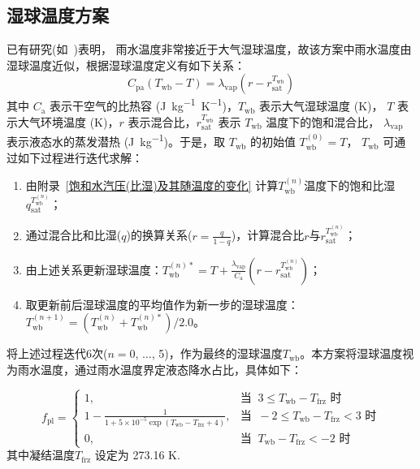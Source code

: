\subsection{湿球温度方案}\label{湿球温度方案}
已有研究(如~\citet{anderson1998moored})表明，
雨水温度非常接近于大气湿球温度，故该方案中雨水温度由湿球温度近似，根据湿球温度定义有如下关系：
\begin{equation}
  \label{eq:湿球温度定义}
  C_{\mathrm{p a}}\left(T_{\mathrm{w b}}-T\right)=\lambda_{\mathrm{vap}}\left(r-r_{\mathrm{s a t}}^{T_{\mathrm{w b}}}\right)
\end{equation}
其中 $C_{\mathrm{a}}$ 表示干空气的比热容 (\unit{J.kg^{-1}.K^{-1}})，$T_{\mathrm{wb}}$ 表示大气湿球温度 (K)，
$T$ 表示大气环境温度 (K)，$r$ 表示混合比，$r_{\mathrm{sat}}^{T_{\mathrm{wb}}}$ 表示 $T_{\mathrm{wb}}$ 温度下的饱和混合比，
$\lambda_{\mathrm {vap}}$ 表示液态水的蒸发潜热 (\unit{J.kg^{-1}})。于是，取 $T_{\mathrm{wb}}$ 的初始值 $T_{\mathrm{wb}}^{\left(0\right)}=T$，
$T_{\mathrm{wb}}$ 可通过如下过程进行迭代求解：
\begin{enumerate}
  \item 由附录~\ref{饱和水汽压(比湿)及其随温度的变化} 计算$T_{\mathrm{wb}}^{\left(n\right)}$温度下的饱和比湿$q_{\mathrm{sat}}^{T_{\mathrm{wb}}^{\left(n\right)}}$；
  \item 通过混合比和比湿($q$)的换算关系($r=\frac{q}{1-q}$)，计算混合比$r$与$r_{\mathrm{sat}}^{T_{\mathrm{wb}}^{\left(n\right)}}$；
  \item 由上述关系更新湿球温度：$T_{\mathrm{wb}}^{\left(n\right)\ast}=T+\frac{\lambda_{\mathrm {vap}}}{C_{\mathrm{a}}}\left(r-r_{\mathrm{sat}}^{T_{\mathrm{wb}}^{\left(n\right)}}\right)$；
  \item 取更新前后湿球温度的平均值作为新一步的湿球温度：$T_{\mathrm{wb}}^{\left(n+1\right)}=\left(T_{\mathrm{wb}}^{\left(n\right)}+T_{\mathrm{wb}}^{\left(n\right)\ast}\right)/2.0$。
\end{enumerate}
将上述过程迭代6次($n=0$, $\ldots$, 5)，作为最终的湿球温度$T_{\mathrm{wb}}$。本方案将湿球温度视为雨水温度，通过雨水温度界定液态降水占比，具体如下：

\begin{equation}
  f_{\mathrm{pl}}= \begin{cases}
    1, & \text{当 }\ 3\leqslant T_{\mathrm{wb}} - T_{\mathrm{frz}} \text{ 时} \\
    1 - \frac{1}{1 + 5\times10^{-5}\exp{(T_{\mathrm{wb}} - T_{\mathrm{frz}}+4)}} , & \text{当 }\ -2\leqslant T_{\mathrm{wb}} - T_{\mathrm{frz}} < 3 \text{ 时} \\
    0, & \text{当 }\ T_{\mathrm{wb}} - T_{\mathrm{frz}} < -2 \text{ 时}
  \end{cases}
\end{equation}
%
其中凝结温度$T_{\mathrm{frz}}$ 设定为 273.16 K.


